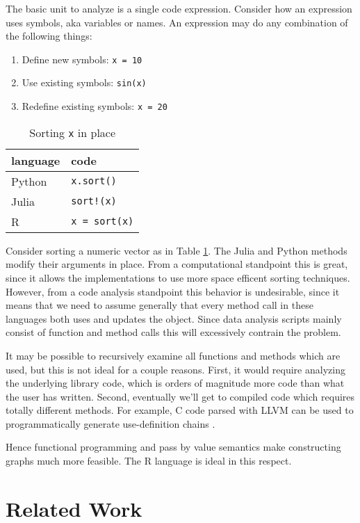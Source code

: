 \documentclass[12pt]{article}
\begin{document}
The basic unit to analyze is a single code expression.
Consider how an expression uses symbols, aka variables or names.
An expression may do any combination of the following things:
\begin{enumerate}
    \item Define new symbols: \texttt{x = 10}
    \item Use existing symbols: \texttt{sin(x)}
    \item Redefine existing symbols: \texttt{x = 20}
\end{enumerate}

\begin{table}[]
\centering
    \caption{Sorting \texttt{x} in place}
\label{tab-sort}
\begin{tabular}{ll}
    \textbf{language} & \textbf{code}        \\
\hline
    Python   & \texttt{x.sort()}    \\
    Julia    & \texttt{sort!(x)}    \\
    R        & \texttt{x = sort(x)}
\end{tabular}
\end{table}

Consider sorting a numeric vector as in Table \ref{tab-sort}.
The Julia and Python methods modify their arguments in place.  From a
computational standpoint this is great, since it allows the implementations
to use more space efficent sorting techniques. However, from a code
analysis standpoint this behavior is undesirable, since it means that we
need to assume generally that every method call in these languages both
uses and updates the object. Since data analysis scripts mainly consist of
function and method calls this will excessively contrain the problem.

It may be possible to recursively examine all functions and methods which
are used, but this is not ideal for a couple reasons. First, it would
require analyzing the underlying library code, which is orders of magnitude
more code than what the user has written. Second, eventually we'll get to
compiled code which requires totally different methods. For example, C code
parsed with LLVM
can be used to programmatically generate use-definition chains
\cite{lattner2004llvm}.

Hence functional programming and pass by value semantics make constructing
graphs much more feasible. The R language is ideal in this respect.

\section{Related Work}
\end{document}

